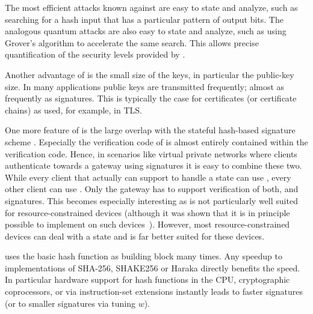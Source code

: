 The most efficient attacks known against \spx
are easy to state and analyze,
such as searching for a hash input that has a particular pattern of output bits.
The analogous quantum attacks are also easy to state and analyze,
such as using Grover's algorithm to accelerate the same search.
This allows precise quantification of the security levels provided by \spx.


Another advantage of \spx is the small size of the keys, in particular the public-key size.
In many applications public keys are transmitted frequently; almost as frequently as
signatures. This is typically the case for certificates (or certificate chains)
as used, for example, in TLS.

One more feature of \spx is the large overlap with the stateful hash-based
signature scheme \xmss. Especially the verification code of \xmss is almost
entirely contained within the \spx verification code. Hence, in scenarios like
virtual private networks where clients authenticate towards a
gateway using signatures it is easy to combine these two. While every client
that actually can support to handle a state can use \xmss, every other client
can use \spx. Only the gateway has to support verification of both,
\xmss and \spx signatures. This becomes especially interesting as \spx is not
particularly well suited for resource-constrained devices (although it was
shown that it is in principle possible to implement \spx on
such devices~\cite{Hulsing2016}). However, most resource-constrained devices
can deal with a state and \xmss is far better suited for these devices.

\spx uses the basic hash function as building block many times. Any speedup
to implementations of SHA-256, SHAKE256 or Haraka directly benefits the
\spx speed. In particular hardware support for hash functions in the CPU,
cryptographic coprocessors,
or via instruction-set extensions instantly leads to faster \spx signatures
(or to smaller \spx signatures via tuning $w$).
